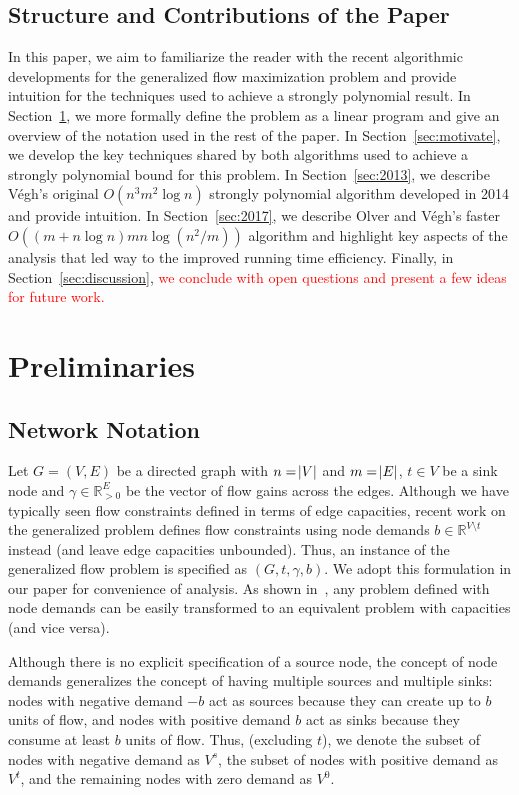 \documentclass[11pt]{article}
\theoremstyle{definition}
\theoremstyle{definition}
\theoremstyle{definition}
\newcommand{\R}{\mathbb{R}}
\newcommand{\vsrc}{V^{s}}
\newcommand{\vsink}{V^{t}}
\newcommand{\vz}{V^{0}}
\newcommand{\rewrite}[1]{\textcolor{red}{#1}}
\begin{document}
	\subsection{Structure and Contributions of the Paper}\label{sec:structure}
	In this paper, we aim to
	familiarize the reader with the recent algorithmic developments for the
	generalized flow maximization problem and provide intuition for the techniques
	used to achieve a strongly polynomial result. In Section~\ref{sec:prelim}, we more formally
	define the problem as a linear program and give an overview of the notation
	used in the rest of the paper. In Section~\ref{sec:motivate}, we develop the key techniques
	shared by both algorithms used to achieve a strongly polynomial bound for this
	problem. In Section~\ref{sec:2013}, we describe Végh's original $O(n^3m^2 \log n)$ strongly
	polynomial algorithm developed in 2014 and provide intuition. In Section~\ref{sec:2017}, we describe Olver and
	Végh's faster $O((m + n\log n)mn\log(n^2 / m))$ algorithm and highlight key
	aspects of the analysis that led way to the improved running time efficiency.
	Finally, in Section~\ref{sec:discussion}, 
    \rewrite{we conclude with open questions and present a few ideas
	for future work.}
    
\section{Preliminaries}\label{sec:prelim}

	\subsection{Network Notation}\label{sec:notation}
	Let $G=(V,E)$ be a directed graph with $n=\abs{V}$ and $m=\abs{E}$,
	$t \in V$ be a sink node and $\gamma \in \R_{>0}^E$ be the vector of flow gains
	across the edges. Although we have typically seen flow constraints defined in terms of
	edge capacities, recent work on the generalized problem defines flow
	constraints using node demands $b \in \R^{V \setminus t}$ instead (and leave
	edge capacities unbounded). Thus, an instance of the generalized flow problem
	is specified as $(G, t, \gamma, b)$.
	We adopt this formulation in our paper for
	convenience of analysis. As shown in~\cite{Vegh2013}, any problem defined with
	node demands can be easily transformed to an equivalent problem with
	capacities (and vice versa). 

	Although there is no explicit specification of a source node, the concept of
	node demands generalizes the concept of having multiple sources and multiple
	sinks: nodes with negative demand $-b$ act as sources because they can create
	up to $b$ units of flow, and nodes with positive demand $b$ act as sinks 
	because they consume at least $b$ units of flow. Thus, (excluding $t$), we denote the subset of
	nodes with negative demand as $\vsrc$, the subset of nodes with positive
	demand as $\vsink$, and the remaining nodes with zero demand as $\vz$.
\end{document}

